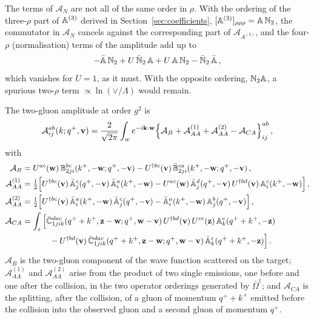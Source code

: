 The terms of $\mathcal A_N$ are not all of the same order in $\rho$. With the ordering of the three-$\rho$ part of $\mathbb{A}^{(3)}$ derived in Section~\ref{sec:coefficients}, $[\mathbb{A}^{(3)}]_{\rho\rho\rho}=\mathbb{A}\,\mathbb{N}_2$, the commutator in $\mathcal A_N$ cancels against the corresponding part of $\mathcal A_{A^{(3)}}$, and the four-$\rho$ (normalisation) terms of the amplitude add up to
\begin{align}\label{eq:Nterms}
-\bar{\mathbb{A}}\,\mathbb{N}_2+U\,\bar{\mathbb{N}}_2\,\mathbb{A}+U\,\mathbb{A}\,\mathbb{N}_2-\bar{\mathbb{N}}_2\,\bar{\mathbb{A}}\,,
\end{align}
which vanishes for $U=1$, as it must. With the opposite ordering, $\mathbb{N}_2\mathbb{A}$, a spurious two-$\rho$ term $\propto\ln(\vee/\Lambda)$ would remain.

The two-gluon amplitude at order $g^2$ is
\begin{align}\label{eq:A2gamp}
\mathcal A^{ab}_{ij}(k;q^+,\mathbf{v})=\frac{2}{\sqrt{2\pi}}\int_w e^{-i\mathbf{k}\cdot\mathbf{w}}\Big\{\mathcal A_B+\mathcal A^{(1)}_{AA}+\mathcal A^{(2)}_{AA}-\mathcal A_{CA}\Big\}^{ab}_{ij}\,,
\end{align}
with
\begin{align}
\mathcal A_B&=U^{ac}(\mathbf{w})\,\mathbb{B}^{bc}_{2ji}(k^+,-\mathbf{w};q^+,-\mathbf{v})-U^{\dagger bc}(\mathbf{v})\,\bar{\mathbb{B}}^{ca}_{2ji}(k^+,-\mathbf{w};q^+,-\mathbf{v})\,,
\notag\\
\mathcal A^{(1)}_{AA}&=\tfrac12\Big[U^{\dagger bc}(\mathbf{v})\,\bar{\mathbb{A}}^c_j(q^+,-\mathbf{v})\,\bar{\mathbb{A}}^a_i(k^+,-\mathbf{w})-U^{ac}(\mathbf{w})\,\bar{\mathbb{A}}^d_j(q^+,-\mathbf{v})\,U^{\dagger bd}(\mathbf{v})\,\mathbb{A}^c_i(k^+,-\mathbf{w})\Big]\,,
\notag\\
\mathcal A^{(2)}_{AA}&=\tfrac12\Big[U^{\dagger bc}(\mathbf{v})\,\bar{\mathbb{A}}^a_i(k^+,-\mathbf{w})\,\bar{\mathbb{A}}^c_j(q^+,-\mathbf{v})-\bar{\mathbb{A}}^a_i(k^+,-\mathbf{w})\,\mathbb{A}^b_j(q^+,-\mathbf{v})\Big]\,,
\notag\\
\mathcal A_{CA}&=\int_z\Big[\bar{\mathbb{C}}^{dac}_{1jik}(q^++k^+,\mathbf{z}-\mathbf{w};q^+,\mathbf{w}-\mathbf{v})\,U^{\dagger bd}(\mathbf{v})\,U^{ce}(\mathbf{z})\,\mathbb{A}^e_k(q^++k^+,-\mathbf{z})
\notag\\&\hspace{1.2cm}
-U^{\dagger bd}(\mathbf{v})\,\bar{\mathbb{C}}^{dac}_{1jik}(q^++k^+,\mathbf{z}-\mathbf{w};q^+,\mathbf{w}-\mathbf{v})\,\bar{\mathbb{A}}^c_k(q^++k^+,-\mathbf{z})\Big]\,.
\end{align}
$\mathcal A_B$ is the two-gluon component of the wave function scattered on the target; $\mathcal A^{(1)}_{AA}$ and $\mathcal A^{(2)}_{AA}$ arise from the product of two single emissions, one before and one after the collision, in the two operator orderings generated by $\bar\Omega^\dagger$; and $\mathcal A_{CA}$ is the splitting, after the collision, of a gluon of momentum $q^++k^+$ emitted before the collision into the observed gluon and a second gluon of momentum $q^+$.

